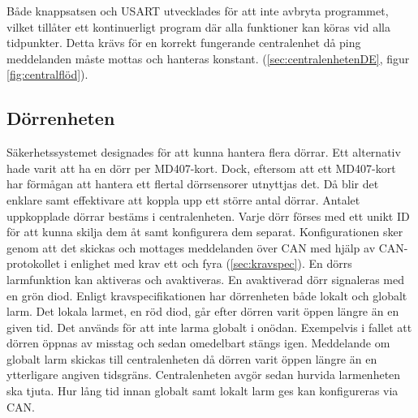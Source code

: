 Både knappsatsen och USART utvecklades för att inte avbryta programmet, vilket tillåter ett kontinuerligt program där alla funktioner kan köras vid alla tidpunkter. Detta krävs för en korrekt fungerande centralenhet då ping meddelanden måste mottas och hanteras konstant. (\ref{sec:centralenhetenDE}, figur \ref{fig:centralflöd}).



\subsection{Dörrenheten}
\label{sec:dörrenhetenDE} %
Säkerhetssystemet designades för att kunna hantera flera dörrar. Ett alternativ hade varit att ha en dörr per MD407-kort. Dock, eftersom att ett MD407-kort har förmågan att hantera ett flertal dörrsensorer utnyttjas det. Då blir det enklare samt effektivare att koppla upp ett större antal dörrar. Antalet uppkopplade dörrar bestäms i centralenheten. Varje dörr förses med ett unikt ID för att kunna skilja dem åt samt konfigurera dem separat. Konfigurationen sker genom att det skickas och mottages meddelanden över CAN med hjälp av CAN-protokollet i enlighet med krav ett och fyra (\ref{sec:kravspec}).
\newline\newline
En dörrs larmfunktion kan aktiveras och avaktiveras. En avaktiverad dörr signaleras med en grön diod. 
Enligt kravspecifikationen har dörrenheten både lokalt och globalt larm. 
Det lokala larmet, en röd diod, går efter dörren varit öppen längre än en given tid. 
Det används för att inte larma globalt i onödan. 
Exempelvis i fallet att dörren öppnas av misstag och sedan omedelbart stängs igen. 
Meddelande om globalt larm skickas till centralenheten då dörren varit öppen längre än en ytterligare angiven tidsgräns. 
Centralenheten avgör sedan hurvida larmenheten ska tjuta. Hur lång tid innan globalt samt lokalt larm ges kan konfigureras via CAN.

